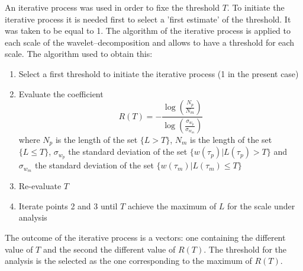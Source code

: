\documentclass[english]{aiaa-tc}
\begin{document}
An iterative process was used in order to fixe the threshold $T$. To initiate the iterative process it is needed first to select a 'first estimate' of the threshold. It was taken to be equal to 1. The algorithm of the iterative process is applied to each scale of the wavelet--decomposition and allows to have a threshold for each scale. The algorithm used to obtain this:
\begin{enumerate}
  \item Select a first threshold to initiate the iterative process (1 in the present case)
  \item Evaluate the coefficient
  \begin{equation}
    R(T) = -\frac{\log\left(\frac{N_p}{N_m}\right)}{\log\left(\frac{\sigma_{w_p}}{\sigma_{w_m}}\right)}
  \end{equation}
  where $N_p$ is the length of the set $\{L > T\}$, $N_m$ is the length of the set $\{L \leqslant T\}$, $\sigma_{w_p}$ the standard deviation of the set $\{w\left( \tau_p\right) | L\left( \tau_p \right) > T\}$ and $\sigma_{w_m}$ the standard deviation of the set $\{w\left( \tau_m\right) | L\left( \tau_m \right) \leqslant T\}$
  \item Re-evaluate $T$
  \item Iterate points 2 and 3 until $T$ achieve the maximum of $L$ for the scale under analysis
\end{enumerate}
The outcome of the iterative process is a vectors: one containing the different value of $T$ and the second the different value of $R(T)$. The threshold for the analysis is the selected as the one corresponding to the maximum of $R(T)$.
\end{document}
